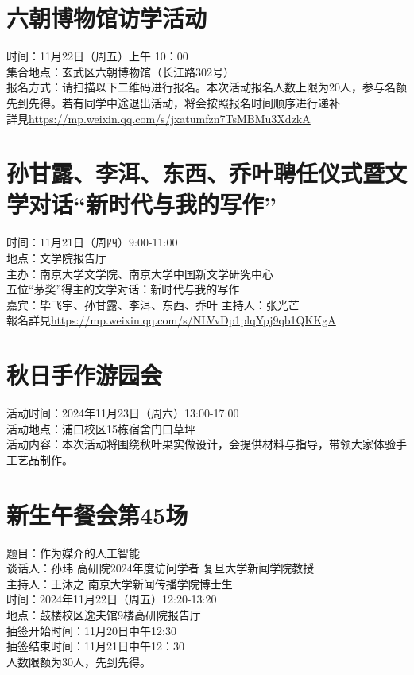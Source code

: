 \documentclass[letterpaper, 12pt]{article}
\begin{document}
\begin{multicols}{2}
\section{六朝博物馆访学活动}
时间：11月22日（周五）上午 10：00\\
集合地点：玄武区六朝博物馆（长江路302号）\\
报名方式：请扫描以下二维码进行报名。本次活动报名人数上限为20人，参与名额先到先得。若有同学中途退出活动，将会按照报名时间顺序进行递补\\
詳見\url{https://mp.weixin.qq.com/s/jxatumfzn7TsMBMu3XdzkA}

\section{孙甘露、李洱、东西、乔叶聘任仪式暨文学对话“新时代与我的写作”}
时间：11月21日（周四）9:00-11:00\\
地点：文学院报告厅\\
主办：南京大学文学院、南京大学中国新文学研究中心\\
五位“茅奖”得主的文学对话：新时代与我的写作\\
嘉宾：毕飞宇、孙甘露、李洱、东西、乔叶 主持人：张光芒\\
報名詳見\url{https://mp.weixin.qq.com/s/NLVvDp1plqYpj9qb1QKKgA}

\section{秋日手作游园会}
活动时间：2024年11月23日（周六）13:00-17:00\\
活动地点：浦口校区15栋宿舍门口草坪\\
活动内容：本次活动将围绕秋叶果实做设计，会提供材料与指导，带领大家体验手工艺品制作。


\section{新生午餐会第45场}
题目：作为媒介的人工智能\\
谈话人：孙玮 高研院2024年度访问学者 复旦大学新闻学院教授\\
主持人：王沐之 南京大学新闻传播学院博士生\\
时间：2024年11月22日（周五）12:20-13:20\\
地点：鼓楼校区逸夫馆9楼高研院报告厅\\
抽签开始时间：11月20日中午12:30\\
抽签结束时间：11月21日中午12：30\\
人数限额为30人，先到先得。\\




\end{multicols}
\end{document}
